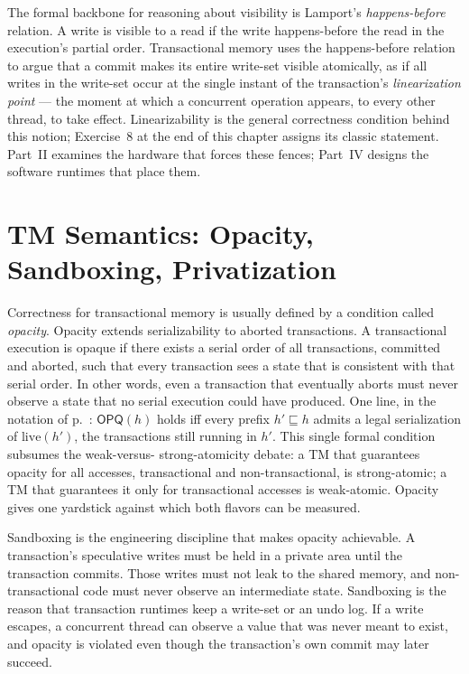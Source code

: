 The formal backbone for reasoning about visibility is Lamport's
\emph{happens-before} relation. A write is visible to a read if the write
happens-before the read in the execution's partial order. Transactional memory
uses the happens-before relation to argue that a commit makes its entire
write-set visible atomically, as if all writes in the write-set occur at the
single instant of the transaction's \emph{linearization point} --- the moment
at which a concurrent operation appears, to every other thread, to take effect.
Linearizability is the general correctness condition behind this notion;
Exercise~8 at the end of this chapter assigns its classic statement. Part~II examines the
hardware that forces these fences; Part~IV designs the software runtimes that
place them.

\section{TM Semantics: Opacity, Sandboxing, Privatization}
\label{sec:tm-semantics}

Correctness for transactional memory is usually defined by a condition called
\emph{opacity}. Opacity extends serializability to aborted transactions. A
transactional execution is opaque if there exists a serial order of all
transactions, committed and aborted, such that every transaction sees a state
that is consistent with that serial order. In other words, even a transaction
that eventually aborts must never observe a state that no serial execution
could have produced. One line, in the notation of p.~\pageref{cha:notation}:
$\mathsf{OPQ}(h)$ holds iff every prefix $h' \sqsubseteq h$ admits a legal
serialization of $\mathrm{live}(h')$, the transactions still running in
$h'$. This single formal condition subsumes the weak-versus-
strong-atomicity debate: a TM that guarantees opacity for all accesses,
transactional and non-transactional, is strong-atomic; a TM that guarantees it
only for transactional accesses is weak-atomic. Opacity gives one yardstick
against which both flavors can be measured.

Sandboxing is the engineering discipline that makes opacity achievable. A
transaction's speculative writes must be held in a private area until the
transaction commits. Those writes must not leak to the shared memory, and
non-transactional code must never observe an intermediate state. Sandboxing is
the reason that transaction runtimes keep a write-set or an undo log. If a
write escapes, a concurrent thread can observe a value that was never meant to
exist, and opacity is violated even though the transaction's own commit may
later succeed.

